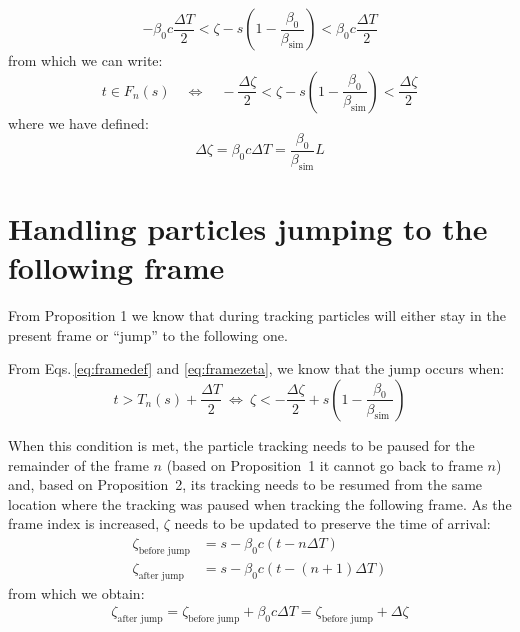 \begin{equation}
-\beta_0 c \frac{\Delta T}{2} < \zeta - s \left(1 -  \frac{\beta_0}{\beta_\text{sim} }\right) < \beta_0 c\frac{\Delta T}{2}
\end{equation}
from which we can write:
\begin{equation}
\boxed{
t \in F_n(s) \quad \Leftrightarrow \quad
-\frac{\Delta \zeta}{2} < \zeta - s \left(1 -  \frac{\beta_0}{\beta_\text{sim} }\right) < \frac{\Delta \zeta}{2}
}
\label{eq:framezeta}
\end{equation}
where we have defined:
\begin{equation}
\boxed{
 \Delta \zeta = \beta_0 c \Delta T = \frac{\beta_0}{\beta_\text{sim}} L
}
\end{equation}

\section{Handling particles jumping to the following frame}

From Proposition 1 we know that during tracking particles will either stay in the present frame or ``jump'' to the following one.

From Eqs.\,\ref{eq:framedef} and \ref{eq:framezeta}, we know that the jump occurs when:
\begin{equation}
t > T_n(s) + \frac{\Delta T}{2}
~
\Leftrightarrow
~
\zeta < -\frac{\Delta \zeta}{2} + s\left(1-\frac{\beta_0}{\beta_{\text {sim }}}\right)
 \end{equation}

When this condition is met, the particle tracking needs to be paused for the remainder of the frame $n$ (based on Proposition~1 it cannot go back to frame $n$) and, based on Proposition~2, its tracking needs to be resumed from the same location where the tracking was paused when tracking the following frame.
As the frame index is increased, $\zeta$ needs to be updated to preserve the time of arrival:
\begin{align}
\zeta_\text{before jump} &= s  - \beta_0 c \left( t - n\Delta T \right) \\
\zeta_\text{after jump} &= s  - \beta_0 c \left( t - (n+1) \Delta T \right)
\end{align}
from which we obtain:
\begin{align}
\boxed{
\zeta_\text{after jump} = \zeta_\text{before jump} + \beta_0 c \Delta T = \zeta_\text{before jump} + \Delta \zeta
}
\end{align}




